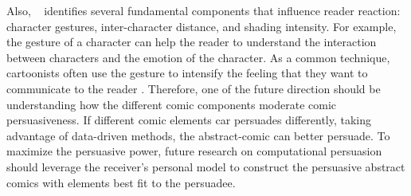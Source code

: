 Also, ~\textcite{scott1993understanding} identifies several fundamental components that influence reader reaction: character gestures, inter-character distance, and shading intensity. For example, the gesture of a character can help the reader to understand the interaction between characters and the emotion of the character. As a common technique, cartoonists often use the gesture to intensify the feeling that they want to communicate to the reader \cite{scott1993understanding}. Therefore, one of the future direction should be understanding how the different comic components moderate comic persuasiveness. If different comic elements car persuades differently, taking advantage of data-driven methods, the abstract-comic can better persuade. To maximize the persuasive power, future research on computational persuasion should leverage the receiver's personal model to construct the persuasive abstract comics with elements best fit to the persuadee.